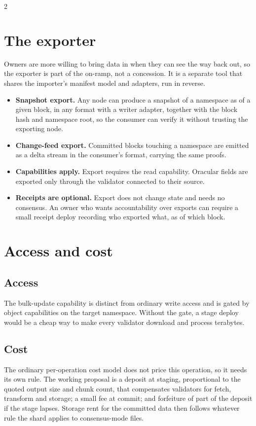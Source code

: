 \documentclass[10pt]{article}
\begin{document}
\begin{multicols}{2}

\section{The exporter}

Owners are more willing to bring data in when they can see the way back out, so
the exporter is part of the on-ramp, not a concession. It is a separate tool that
shares the importer's manifest model and adapters, run in reverse.

\begin{itemize}
\item \textbf{Snapshot export.} Any node can produce a snapshot of a namespace as
  of a given block, in any format with a writer adapter, together with the block
  hash and namespace root, so the consumer can verify it without trusting the
  exporting node.
\item \textbf{Change-feed export.} Committed blocks touching a namespace are
  emitted as a delta stream in the consumer's format, carrying the same proofs.
\item \textbf{Capabilities apply.} Export requires the read capability. Oracular
  fields are exported only through the validator connected to their source.
\item \textbf{Receipts are optional.} Export does not change state and needs no
  consensus. An owner who wants accountability over exports can require a small
  receipt deploy recording who exported what, as of which block.
\end{itemize}

\section{Access and cost}\label{sec:cost}

\subsection{Access}
The bulk-update capability is distinct from ordinary write access and is gated by
object capabilities on the target namespace. Without the gate, a stage deploy
would be a cheap way to make every validator download and process terabytes.

\subsection{Cost}
The ordinary per-operation cost model does not price this operation, so it needs
its own rule. The working proposal is a deposit at staging, proportional to the
quoted output size and chunk count, that compensates validators for fetch,
transform and storage; a small fee at commit; and forfeiture of part of the deposit
if the stage lapses. Storage rent for the committed data then follows whatever
rule the shard applies to consensus-mode files.


\end{multicols}
\end{document}
